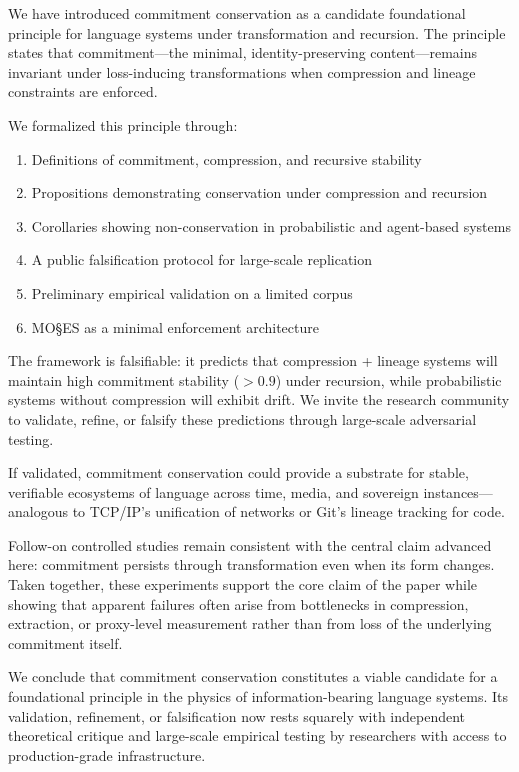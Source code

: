 \documentclass[11pt,a4paper]{article}
\begin{document}
We have introduced commitment conservation as a candidate foundational principle for language systems under transformation and recursion. The principle states that commitment---the minimal, identity-preserving content---remains invariant under loss-inducing transformations when compression and lineage constraints are enforced.

We formalized this principle through:
\begin{enumerate}
    \item Definitions of commitment, compression, and recursive stability
    \item Propositions demonstrating conservation under compression and recursion
    \item Corollaries showing non-conservation in probabilistic and agent-based systems
    \item A public falsification protocol for large-scale replication
    \item Preliminary empirical validation on a limited corpus
    \item MO\S{}ES\texttrademark{} as a minimal enforcement architecture
\end{enumerate}

The framework is falsifiable: it predicts that compression + lineage systems will maintain high commitment stability ($>0.9$) under recursion, while probabilistic systems without compression will exhibit drift. We invite the research community to validate, refine, or falsify these predictions through large-scale adversarial testing.

If validated, commitment conservation could provide a substrate for stable, verifiable ecosystems of language across time, media, and sovereign instances---analogous to TCP/IP's unification of networks or Git's lineage tracking for code.

Follow-on controlled studies remain consistent with the central claim advanced here: commitment persists through transformation even when its form changes. Taken together, these experiments support the core claim of the paper while showing that apparent failures often arise from bottlenecks in compression, extraction, or proxy-level measurement rather than from loss of the underlying commitment itself.

We conclude that commitment conservation constitutes a viable candidate for a foundational principle in the physics of information-bearing language systems. Its validation, refinement, or falsification now rests squarely with independent theoretical critique and large-scale empirical testing by researchers with access to production-grade infrastructure.
\end{document}
